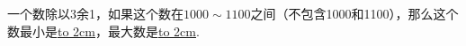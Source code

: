 一个数除以3余1，如果这个数在$1000\sim1100$之间（不包含1000和1100），那么这个数最小是\underline{\hbox to 2cm{}}，最大数是\underline{\hbox to 2cm{}}.